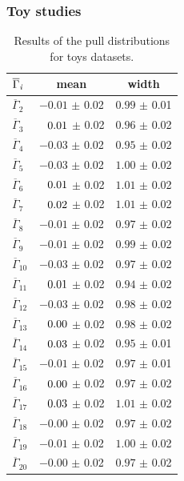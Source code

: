 \subsubsection{Toy studies}

\begin{table}[!tb]
\caption{Results of the pull distributions for toys datasets.}
\centering
\begin{tabular}{l|c|c}
$\overline{\Gamma}_{\it{i}}$ & mean & width \\ 
\hline
$\overline{\Gamma}_{2}$ & $-0.01$ $\pm$ 0.02 & $0.99$ $\pm$ 0.01 \\ 
$\overline{\Gamma}_{3}$ & $\hphantom{-}0.01$ $\pm$ 0.02 & $0.96$ $\pm$ 0.02 \\ 
$\overline{\Gamma}_{4}$ & $-0.03$ $\pm$ 0.02 & $0.95$ $\pm$ 0.02 \\ 
$\overline{\Gamma}_{5}$ & $-0.03$ $\pm$ 0.02 & $1.00$ $\pm$ 0.02 \\ 
$\overline{\Gamma}_{6}$ & $\hphantom{-}0.01$ $\pm$ 0.02 & $1.01$ $\pm$ 0.02 \\ 
$\overline{\Gamma}_{7}$ & $\hphantom{-}0.02$ $\pm$ 0.02 & $1.01$ $\pm$ 0.02 \\ 
$\overline{\Gamma}_{8}$ & $-0.01$ $\pm$ 0.02 & $0.97$ $\pm$ 0.02 \\ 
$\overline{\Gamma}_{9}$ & $-0.01$ $\pm$ 0.02 & $0.99$ $\pm$ 0.02 \\ 
$\overline{\Gamma}_{10}$ & $-0.03$ $\pm$ 0.02 & $0.97$ $\pm$ 0.02 \\ 
$\overline{\Gamma}_{11}$ & $\hphantom{-}0.01$ $\pm$ 0.02 & $0.94$ $\pm$ 0.02 \\ 
$\overline{\Gamma}_{12}$ & $-0.03$ $\pm$ 0.02 & $0.98$ $\pm$ 0.02 \\ 
$\overline{\Gamma}_{13}$ & $\hphantom{-}0.00$ $\pm$ 0.02 & $0.98$ $\pm$ 0.02 \\ 
$\overline{\Gamma}_{14}$ & $\hphantom{-}0.03$ $\pm$ 0.02 & $0.95$ $\pm$ 0.01 \\ 
$\overline{\Gamma}_{15}$ & $-0.01$ $\pm$ 0.02 & $0.97$ $\pm$ 0.01 \\ 
$\overline{\Gamma}_{16}$ & $\hphantom{-}0.00$ $\pm$ 0.02 & $0.97$ $\pm$ 0.02 \\ 
$\overline{\Gamma}_{17}$ & $\hphantom{-}0.03$ $\pm$ 0.02 & $1.01$ $\pm$ 0.02 \\ 
$\overline{\Gamma}_{18}$ & $-0.00$ $\pm$ 0.02 & $0.97$ $\pm$ 0.02 \\ 
$\overline{\Gamma}_{19}$ & $-0.01$ $\pm$ 0.02 & $1.00$ $\pm$ 0.02 \\ 
$\overline{\Gamma}_{20}$ & $-0.00$ $\pm$ 0.02 & $0.97$ $\pm$ 0.02 \\ 

\end{tabular}
\end{table}
